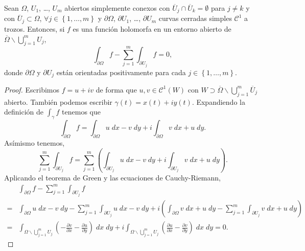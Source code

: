 \begin{theorem}
	Sean $\displaystyle \Omega  $, $\displaystyle U_{1} $, \ldots, $\displaystyle U_{m} $ abiertos simplemente conexos con $\displaystyle \overline{U}_{j}\cap \overline{U}_{k} = \emptyset $ para $\displaystyle j \neq k $ y con $\displaystyle \overline{U}_{j}\subset \Omega  $, $\displaystyle \forall j \in \left\{ 1, \ldots, m\right\}  $ y $\displaystyle \partial \Omega  $, $\displaystyle \partial U_{1} $, \ldots, $\displaystyle \partial U_{m} $ curvas cerradas simples $\displaystyle \mathcal{C}^{1} $ a trozos. Entonces, si $\displaystyle f $ es una función holomorfa en un entorno abierto de $\displaystyle \overline{\Omega }\backslash \bigcup_{j = 1}^{m}U_{j} $,
	\[\int _{\partial \Omega }f -\sum^{m}_{j = 1}\int _{\partial U_{j}}f =0 ,\]
	donde $\displaystyle \partial \Omega  $ y $\displaystyle \partial U_{j} $ están orientadas positivamente para cada $\displaystyle j \in \left\{ 1, \ldots, m\right\}  $. 
\end{theorem}
\begin{proof}
Escribimos $\displaystyle f = u + iv $ de forma que $\displaystyle u,v\in \mathcal{C}^{1}\left(W\right) $ con $\displaystyle W \supset \overline{\Omega }\backslash \bigcup_{j = 1}^{m}\overline{U}_{j} $ abierto. También podemos escribir $\displaystyle \gamma\left(t\right)=x\left(t\right) + iy\left(t\right) $. Expandiendo la definición de $\displaystyle \int _{\gamma }f  $ tenemos que
\[\int _{\partial \Omega }f = \int _{\partial \Omega }u \; dx - v \; dy + i \int _{\partial \Omega }v \; dx + u \; dy .\]
Asímismo tenemos,
\[\sum^{m}_{j = 1}\int _{\partial U_{j}}f =\sum^{m}_{j = 1}\left(\int _{\partial U_{j}}u \; dx - v \; dy + i\int _{\partial U_{j}}v \; dx + u \; dy\right) .\]
Aplicando el teorema de Green y las ecuaciones de Cauchy-Riemann,
\[
\begin{split}
	& \int _{\partial \Omega }f -\sum^{m}_{j = 1}\int _{\partial U_{j}}f \\
	= & \int _{\partial \Omega }u \; dx - v\; dy -\sum^{m}_{j = 1}\int _{\partial U_{j}}u \; dx - v\; dy + i\left(\int _{\partial \Omega }v \; dx + u\; dy-\sum^{m}_{j = 1}\int _{\partial U_{j}}v \; dx + u\; dy\right)\\
	= & \int _{\Omega \backslash \bigcup_{j = 1}^{m}U_{j}}\left(-\frac{\partial v}{\partial x}-\frac{\partial u}{\partial y}\right) \; dx \; dy + i \int _{\Omega \backslash \bigcup_{j = 1}^{m}U_{j}}\left(\frac{\partial u}{\partial x}-\frac{\partial v}{\partial y}\right) \; dx \; dy = 0.
\end{split}
\]
\end{proof}
